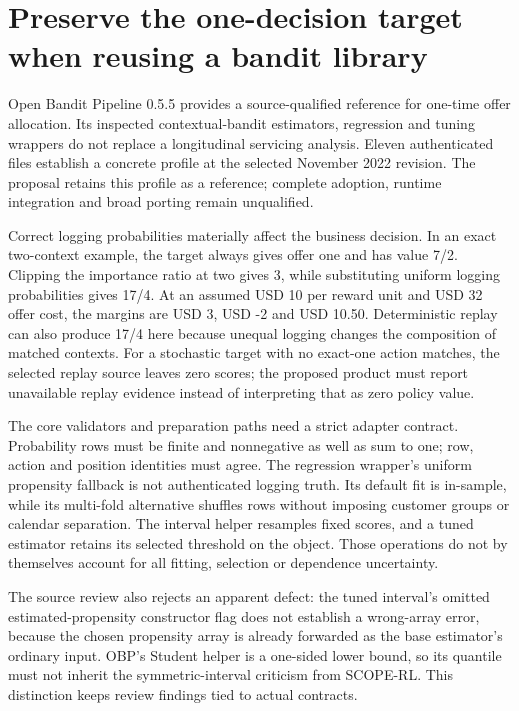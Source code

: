\hypertarget{preserve-the-one-decision-target-when-reusing-a-bandit-library}{%
\section{Preserve the one-decision target when reusing a bandit
library}\label{preserve-the-one-decision-target-when-reusing-a-bandit-library}}

Open Bandit Pipeline 0.5.5 provides a source-qualified reference for
one-time offer allocation. Its inspected contextual-bandit estimators,
regression and tuning wrappers do not replace a longitudinal servicing
analysis. Eleven authenticated files establish a concrete profile at the
selected November 2022 revision. The proposal retains this profile as a
reference; complete adoption, runtime integration and broad porting
remain unqualified. \citep{exec23_obp_sources}

Correct logging probabilities materially affect the business decision.
In an exact two-context example, the target always gives offer one and
has value 7/2. Clipping the importance ratio at two gives 3, while
substituting uniform logging probabilities gives 17/4. At an assumed USD
10 per reward unit and USD 32 offer cost, the margins are USD 3, USD -2
and USD 10.50. Deterministic replay can also produce 17/4 here because
unequal logging changes the composition of matched contexts. For a
stochastic target with no exact-one action matches, the selected replay
source leaves zero scores; the proposed product must report unavailable
replay evidence instead of interpreting that as zero policy value.
\citep{exec23_obp_sources,exec23_obp_reference}

The core validators and preparation paths need a strict adapter
contract. Probability rows must be finite and nonnegative as well as sum
to one; row, action and position identities must agree. The regression
wrapper's uniform propensity fallback is not authenticated logging
truth. Its default fit is in-sample, while its multi-fold alternative
shuffles rows without imposing customer groups or calendar separation.
The interval helper resamples fixed scores, and a tuned estimator
retains its selected threshold on the object. Those operations do not by
themselves account for all fitting, selection or dependence uncertainty.
\citep{exec23_obp_sources}

The source review also rejects an apparent defect: the tuned interval's
omitted estimated-propensity constructor flag does not establish a
wrong-array error, because the chosen propensity array is already
forwarded as the base estimator's ordinary input. OBP's Student helper
is a one-sided lower bound, so its quantile must not inherit the
symmetric-interval criticism from SCOPE-RL. This distinction keeps
review findings tied to actual contracts.
\citep{exec23_obp_sources,exec23_obp_reference}


